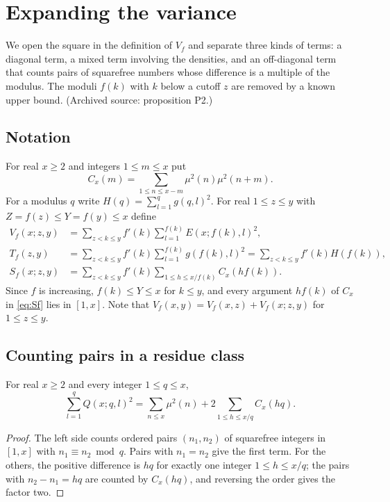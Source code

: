 \chapter{Expanding the variance}\label{ch:variance}

We open the square in the definition of $V_f$ and separate three kinds of terms: a diagonal term, a mixed term involving the densities, and an off-diagonal term that counts pairs of squarefree numbers whose difference is a multiple of the modulus. The moduli $f(k)$ with $k$ below a cutoff $z$ are removed by a known upper bound. (Archived source: proposition P2.)

\section{Notation}

For real $x\ge2$ and integers $1\le m\le x$ put
\begin{equation}\label{eq:Cx}
C_x(m)=\sum_{1\le n\le x-m}\mu^2(n)\mu^2(n+m).
\end{equation}
For a modulus $q$ write $H(q)=\sum_{l=1}^qg(q,l)^2$. For real $1\le z\le y$ with $Z=f(z)\le Y=f(y)\le x$ define
\begin{align}
V_f(x;z,y)&=\sum_{z<k\le y}f'(k)\sum_{l=1}^{f(k)}E(x;f(k),l)^2,\label{eq:Vzy}\\
T_f(z,y)&=\sum_{z<k\le y}f'(k)\sum_{l=1}^{f(k)}g(f(k),l)^2=\sum_{z<k\le y}f'(k)H(f(k)),\label{eq:Tf}\\
S_f(x;z,y)&=\sum_{z<k\le y}f'(k)\sum_{1\le h\le x/f(k)}C_x(hf(k)).\label{eq:Sf}
\end{align}
Since $f$ is increasing, $f(k)\le Y\le x$ for $k\le y$, and every argument $hf(k)$ of $C_x$ in \eqref{eq:Sf} lies in $[1,x]$. Note that $V_f(x,y)=V_f(x,z)+V_f(x;z,y)$ for $1\le z\le y$.

\section{Counting pairs in a residue class}

\begin{lemma}\label{lem:pairs}
For real $x\ge2$ and every integer $1\le q\le x$,
\[
\sum_{l=1}^qQ(x;q,l)^2=\sum_{n\le x}\mu^2(n)+2\sum_{1\le h\le x/q}C_x(hq).
\]
\end{lemma}

\begin{proof}
The left side counts ordered pairs $(n_1,n_2)$ of squarefree integers in $[1,x]$ with $n_1\equiv n_2\bmod q$. Pairs with $n_1=n_2$ give the first term. For the others, the positive difference is $hq$ for exactly one integer $1\le h\le x/q$; the pairs with $n_2-n_1=hq$ are counted by $C_x(hq)$, and reversing the order gives the factor two.
\end{proof}

